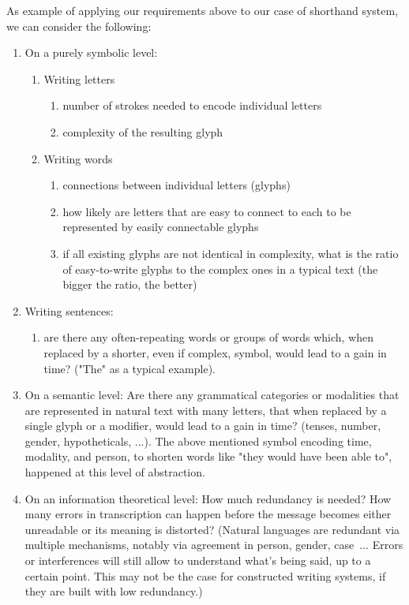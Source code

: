 \documentclass[conference]{IEEEtran}
\begin{document}
As example of applying our requirements above to our case of shorthand system, we can consider the following:
\begin{enumerate}
        \item On a purely symbolic level:
        \begin{enumerate}
                \item Writing letters
                \begin{enumerate}
                        \item number of strokes needed to encode individual letters
                        \item complexity of the resulting glyph
                \end{enumerate}
                \item Writing words
                \begin{enumerate}
                        \item connections between individual letters (glyphs)
                        \item how likely are letters that are easy to connect to each to be represented by easily connectable glyphs
                        \item if all existing glyphs are not identical in complexity, what is the ratio of easy-to-write glyphs to the complex ones in a typical text (the bigger the ratio, the better)
                \end{enumerate}
        \end{enumerate}
        \item Writing sentences:
        \begin{enumerate}
                \item are there any often-repeating words or groups of words which, when replaced by a shorter, even if complex, symbol, would lead to a gain in time? ("The" as a typical example).
        \end{enumerate}
        \item On a semantic level: Are there any grammatical categories or modalities that are represented in natural text with many letters, that when replaced by a single glyph or a modifier, would lead to a gain in time? (tenses, number, gender, hypotheticals, ...). The above mentioned symbol encoding time, modality, and person, to shorten words like "they would have been able to", happened at this level of abstraction.
        \item On an information theoretical level: How much redundancy is needed? How many errors in transcription can happen before the message becomes either unreadable or its meaning is distorted?  (Natural languages  are redundant via multiple mechanisms, notably via agreement in person, gender, case~\cite{bussmann2006routledge}... Errors or interferences will still allow to understand what’s being said, up to a certain point. This may not be the case for constructed writing systems, if they
                are built with low redundancy.)~\cite{reza1961introduction} 
\end{enumerate}
\end{document}
